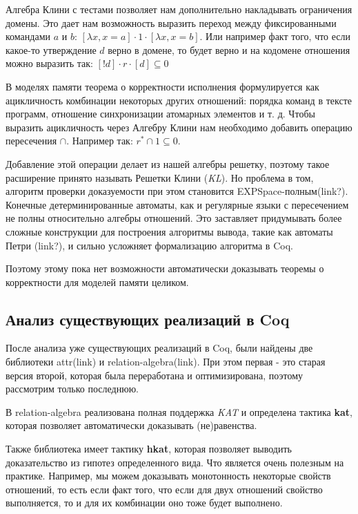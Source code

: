 \documentclass[times
              ]{itmo-student-thesis}
\begin{document}
    Алгебра Клини с тестами позволяет нам дополнительно накладывать ограничения домены. Это дает нам возможность выразить переход между фиксированными командами $ a $ и $ b $:
    $ [\lambda x, x = a]\cdot 1 \cdot[\lambda x, x =b] $. Или например факт того, что если какое-то утверждение $ d $ верно в домене, то будет верно и на кодомене отношения можно выразить так: $ [!d] \cdot r \cdot [d] \subseteq 0 $

    В моделях памяти теорема о корректности исполнения формулируется как ацикличность комбинации некоторых других отношений: порядка команд в тексте программ, отношение синхронизации атомарных элементов и т. д. Чтобы выразить ацикличность через Алгебру Клини нам необходимо добавить операцию пересечения $ \cap $. Например так: $ r^* \cap 1 \subseteq 0 $.

    Добавление этой операции делает из нашей алгебры решетку, поэтому такое расширение принято называть Решетки Клини (\textit{KL}). Но проблема в том, алгоритм проверки доказуемости при этом становится EXPSpace-полным(link?).
    Конечные детерминированные автоматы, как и регулярные языки с пересечением не полны относительно алгебры отношений. Это заставляет придумывать более сложные конструкции для построения алгоритмы вывода, такие как автоматы Петри (link?), и сильно усложняет формализацию алгоритма в Coq.

    Поэтому этому пока нет возможности автоматически доказывать теоремы о корректности для моделей памяти целиком.
  \subsection{Анализ существующих реализаций в Coq}

    После анализа уже существующих реализаций в Coq, были найдены две библиотеки attr(link) и relation-algebra(link). При этом первая - это старая версия второй, которая была переработана и оптимизирована, поэтому рассмотрим только последнюю.

    В relation-algebra реализована полная поддержка \textit{KAT} и определена тактика \textbf{kat}, которая позволяет автоматически доказывать (не)равенства.

    Также библиотека имеет тактику \textbf{hkat}, которая позволяет выводить доказательство из гипотез определенного вида. Что является очень полезным на практике. Например, мы можем доказывать монотонность некоторые свойств отношений, то есть если факт того, что если для двух отношений свойство выполняется, то и для их комбинации оно тоже будет выполнено.
\end{document}
